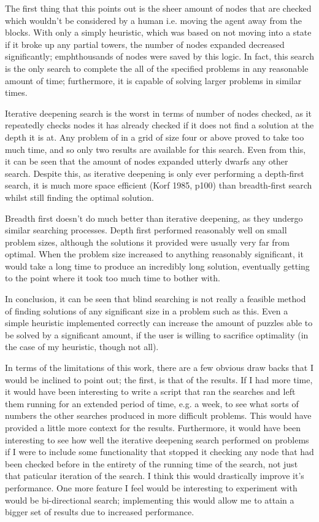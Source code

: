 \documentclass[a4paper,10pt]{article}
\begin{document}
The first thing that this points out is the sheer amount of nodes that are checked which wouldn't be considered by a human i.e. moving the agent away from the blocks. 
With only a simply heuristic, which was based on not moving into a state if it broke up any partial towers, the number of nodes expanded decreased significantly; emph{thousands} of nodes were saved by this logic. 
In fact, this search is the only search to complete the all of the specified problems in any reasonable amount of time; furthermore, it is capable of solving larger problems in similar times.

Iterative deepening search is the worst in terms of number of nodes checked, as it repeatedly checks nodes it has already checked if it does not find a solution at the depth it is at. 
Any problem of in a grid of size four or above proved to take too much time, and so only two results are available for this search.
Even from this, it can be seen that the amount of nodes expanded utterly dwarfs any other search.
Despite this, as iterative deepening is only ever performing a depth-first search, it is much more space efficient (Korf 1985, p100) than breadth-first search whilst still finding the optimal solution. 

Breadth first doesn't do much better than iterative deepening, as they undergo similar searching processes. 
Depth first performed reasonably well on small problem sizes, although the solutions it provided were usually very far from optimal.
When the problem size increased to anything reasonably significant, it would take a long time to produce an incredibly long solution, eventually getting to the point where it took too much time to bother with.

In conclusion, it can be seen that blind searching is not really a feasible method of finding solutions of any significant size in a problem such as this. Even a simple heuristic implemented correctly can 
increase the amount of puzzles able to be solved by a significant amount, if the user is willing to sacrifice optimality (in the case of my heuristic, though not all). 

In terms of the limitations of this work, there are a few obvious draw backs that 
I would be inclined to point out; the first, is that of the results. If I had more time, it would have been interesting to write a script that ran the searches and left them running for an extended period of time, 
e.g. a week, to see what sorts of numbers the other searches produced in more difficult problems. This would have provided a little more context for the results. Furthermore, it would have been interesting 
to see how well the iterative deepening search performed on problems if I were to include some functionality that stopped it checking any node that had been checked before in the entirety of the running time of the 
search, not just that paticular iteration of the search. I think this would drastically improve it's performance. One more feature I feel would be interesting to experiment with would be bi-directional search; 
implementing this would allow me to attain a bigger set of results due to increased performance.
\end{document}
